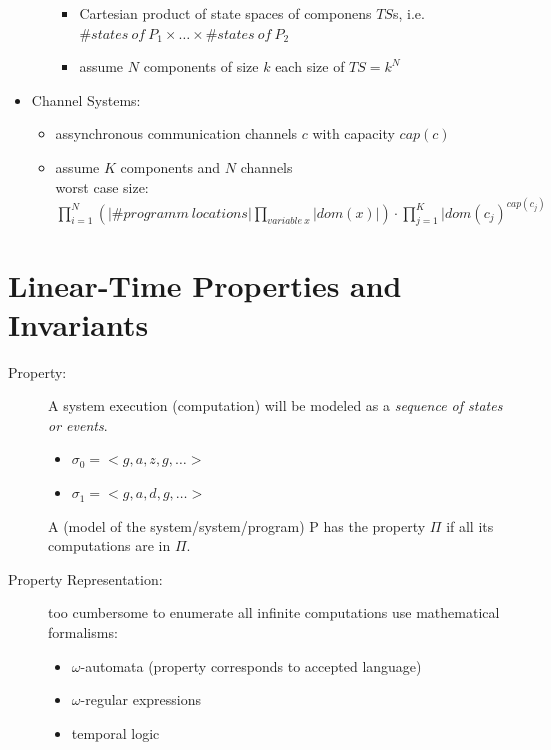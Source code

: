 \documentclass[a4paper, 10pt]{article}
\begin{document}
\begin{itemize}
\begin{itemize}
        \begin{itemize}
            \item Cartesian product of state spaces of componens $TS$s, i.e. $\#states\ of \ P_1\times \dots \times \#states\ of \ P_2$
            \item assume $N$ components of size $k$ each \follows size of $TS=k^N$
        \end{itemize}
    \end{itemize}
    \item Channel Systems:
    \begin{itemize}
        \item assynchronous communication channels $c$ with capacity $cap(c)$
        \item assume $K$ components and $N$ channels
        \\ \follows worst case size: $\displaystyle \prod^N_{i=1} \left(|\#programm\ locations| \prod_{variable\ x} |dom(x)|\right)\cdot\prod^K_{j=1}|dom(c_j)^{cap(c_j)}$
    \end{itemize}
\end{itemize}

\section*{Linear-Time Properties and Invariants}
\begin{description}
    \item[Property:] A system execution (computation) will be modeled as a \emph{sequence of states or events}.
    \begin{itemize}
        \item $\sigma_0 = <g,a,z,g,\dots>$
        \item $\sigma_1 = <g,a,d,g,\dots>$
    \end{itemize}
    \begin{shaded}
        A (model of the system/system/program) P has the property $\Pi$ if all its computations are in $\Pi$.
    \end{shaded}
    \item[Property Representation:] too cumbersome to enumerate all infinite computations \follows use mathematical formalisms:
    \begin{itemize}
        \item $\omega$-automata (property corresponds to accepted language)
        \item $\omega$-regular expressions
        \item temporal logic
    \end{itemize}
\end{description}
\end{document}
